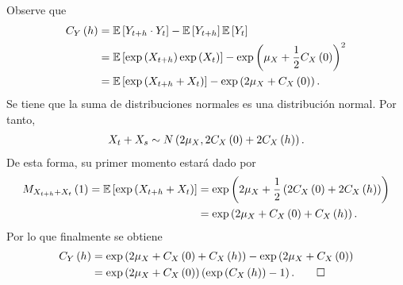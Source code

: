 \documentclass[../main.tex]{subfiles}
\begin{document}
    \begin{demostracion}
        Observe que
            \begin{align*}
            	C_Y\left( h \right) &= \mathbb{E} \left[ Y_{t+h} \cdot Y_t \right] - \mathbb{E} \left[ Y_{t+h} \right]\mathbb{E} \left[ Y_t \right]\\
            	&= \mathbb{E} \left[ \exp\left( X_{t+h} \right) \exp\left( X_t \right) \right] - \exp\left( \mu_X + \frac 1 2 C_X\left( 0 \right) \right)^2\\
            	&= \mathbb{E} \left[ \exp\left( X_{t+h} + X_t \right) \right] - \exp\left( 2\mu_X + C_X\left( 0 \right) \right).
            \end{align*}
        Se tiene que la suma de distribuciones normales es una distribución normal. Por tanto,
            \begin{align*}
            	X_t + X_s \sim N\left( 2 \mu_X, 2 C_X\left( 0 \right) + 2 C_X\left( h \right) \right).
            \end{align*}
        De esta forma, su primer momento estará dado por
            \begin{align*}
            	M_{X_{t+h}+X_t}\left( 1 \right) = \mathbb{E} \left[ \exp\left( X_{t+h}+X_t \right) \right] &= \exp\left( 2 \mu_X + \frac 1 2 \left( 2 C_X\left( 0 \right) + 2 C_X\left( h \right) \right) \right)\\ &= \exp\left( 2 \mu_X + C_X\left( 0 \right) + C_X\left( h \right) \right).
            \end{align*}
        Por lo que finalmente se obtiene
            \begin{align*}
            	C_Y\left( h \right) &= \exp\left( 2 \mu_X + C_X\left( 0 \right) + C_X\left( h \right) \right) - \exp\left( 2\mu_X + C_X\left( 0 \right) \right)\\
            	&= \exp\left( 2 \mu_X + C_X\left( 0 \right) \right) \left( \exp\left( C_X\left( h \right) \right) - 1 \right). \qed
            \end{align*}

    \end{demostracion}
\end{document}
